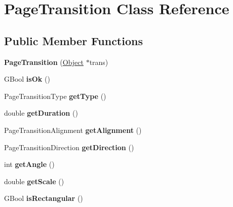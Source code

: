 \hypertarget{class_page_transition}{}\section{Page\+Transition Class Reference}
\label{class_page_transition}
\subsection*{Public Member Functions}
\begin{DoxyCompactItemize}
\item 
\mbox{\label{class_page_transition_a69c347d4c14e07b4a80127fdf19be0d0}} 
{\bfseries Page\+Transition} (\hyperlink{class_object}{Object} $\ast$trans)
\item 
\mbox{\label{class_page_transition_ac5c2815b88a95df1296ae8547c23d5f7}} 
G\+Bool {\bfseries is\+Ok} ()
\item 
\mbox{\label{class_page_transition_a3bf169fc1078d0c8feab6c0b809683bd}} 
Page\+Transition\+Type {\bfseries get\+Type} ()
\item 
\mbox{\label{class_page_transition_a22997f25a613393165891b6c6b832e8f}} 
double {\bfseries get\+Duration} ()
\item 
\mbox{\label{class_page_transition_ae5d53227d22d158a3bcda8f6a035a839}} 
Page\+Transition\+Alignment {\bfseries get\+Alignment} ()
\item 
\mbox{\label{class_page_transition_a3248b6cd80b2c7b5ece209977203fad8}} 
Page\+Transition\+Direction {\bfseries get\+Direction} ()
\item 
\mbox{\label{class_page_transition_a7cdcda87e090c038d02316f2cbc24966}} 
int {\bfseries get\+Angle} ()
\item 
\mbox{\label{class_page_transition_af8bf4d937aa4039f7ba322a2401f8150}} 
double {\bfseries get\+Scale} ()
\item 
\mbox{\label{class_page_transition_a0391435f468f88ad15c4f520ec7b57bb}} 
G\+Bool {\bfseries is\+Rectangular} ()
\end{DoxyCompactItemize}


